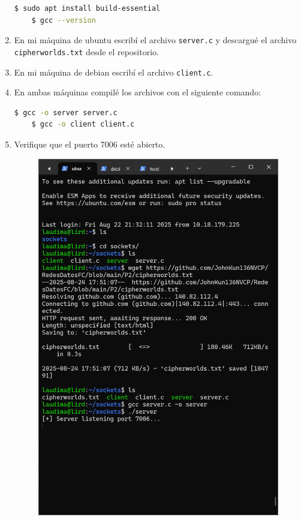 \documentclass{article}
\begin{document}
\begin{enumerate}
    \begin{lstlisting}[language=bash]
    $ sudo apt install build-essential
    $ gcc --version
    \end{lstlisting}
    \item En mi máquina de ubuntu escribí el archivo \texttt{server.c} y descargué el archivo \texttt{cipherworlds.txt} desde el repositorio.
    \item En mi máquina de debian escribí el archivo \texttt{client.c}. 
    \item En ambas máquinas compilé los archivos con el siguiente comando:
    \begin{lstlisting}[language=bash]
    $ gcc -o server server.c
    $ gcc -o client client.c
    \end{lstlisting}
    \item Verifique que el puerto 7006 esté abierto.
    \begin{figure}
        \includegraphics[width=\linewidth]{./images/puerto1.png}

\end{figure}
\end{enumerate}
\end{document}
